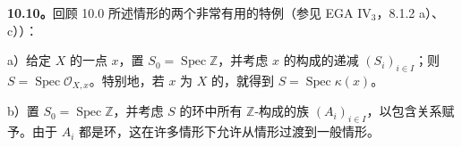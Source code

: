 \textbf{10.10。}回顾 10.0 所述情形的两个非常有用的特例（参见 EGA IV$_3$，8.1.2 a）、c））：

 a）给定 $X$ 的一点 $x$，置 $S_0=\operatorname{Spec}\mathbb Z$，并考虑 $x$ 的构成的递减 $(S_i)_{i\in I}$；则 $S=\operatorname{Spec}\mathcal O_{X,x}$。特别地，若 $x$ 为 $X$ 的，就得到 $S=\operatorname{Spec}\kappa(x)$。

 b）置 $S_0=\operatorname{Spec}\mathbb Z$，并考虑 $S$ 的环中所有 $\mathbb Z$-构成的族 $(A_i)_{i\in I}$，以包含关系赋予。由于 $A_i$ 都是环，这在许多情形下允许从情形过渡到一般情形。


